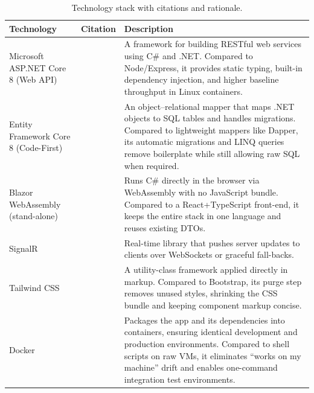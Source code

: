 \begin{table}[H]
\centering
\begin{tabularx}{\linewidth}{@{}p{3cm}p{1.5cm}X@{}}
\toprule
\textbf{Technology} & \textbf{Citation} & \textbf{Description}\\
\midrule
Microsoft ASP.NET Core 8 (Web API) & \cite{web-api-tutorial} & A framework for building RESTful web services using C\# and .NET. Compared to Node/Express, it provides static typing, built-in dependency injection, and higher baseline throughput in Linux containers.\\\midrule
Entity Framework Core 8 (Code-First) & \cite{Entity-Framework-Core} & An object–relational mapper that maps .NET objects to SQL tables and handles migrations. Compared to lightweight mappers like Dapper, its automatic migrations and LINQ queries remove boilerplate while still allowing raw SQL when required.\\\midrule
Blazor WebAssembly (stand-alone) & \cite{blazor} & Runs C\# directly in the browser via WebAssembly with no JavaScript bundle. Compared to a React+TypeScript front-end, it keeps the entire stack in one language and reuses existing DTOs.\\\midrule
SignalR & \cite{signalr} & Real-time library that pushes server updates to clients over WebSockets or graceful fall-backs.\\\midrule
Tailwind CSS & \cite{tailwind} & A utility-class framework applied directly in markup. Compared to Bootstrap, its purge step removes unused styles, shrinking the CSS bundle and keeping component markup concise.\\\midrule
Docker & \cite{docker} & Packages the app and its dependencies into containers, ensuring identical development and production environments. Compared to shell scripts on raw VMs, it eliminates “works on my machine” drift and enables one-command integration test environments.\\
\bottomrule
\end{tabularx}
\caption{Technology stack with citations and rationale.}
\end{table}

